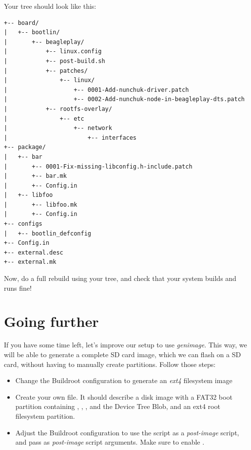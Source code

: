 Your  tree should look like this:

\begin{verbatim}
+-- board/
|   +-- bootlin/
|       +-- beagleplay/
|           +-- linux.config
|           +-- post-build.sh
|           +-- patches/
|               +-- linux/
|                   +-- 0001-Add-nunchuk-driver.patch
|                   +-- 0002-Add-nunchuk-node-in-beagleplay-dts.patch
|           +-- rootfs-overlay/
|               +-- etc
|                   +-- network
|                       +-- interfaces
+-- package/
|   +-- bar
|       +-- 0001-Fix-missing-libconfig.h-include.patch
|       +-- bar.mk
|       +-- Config.in
|   +-- libfoo
|       +-- libfoo.mk
|       +-- Config.in
+-- configs
|   +-- bootlin_defconfig
+-- Config.in
+-- external.desc
+-- external.mk
\end{verbatim}

Now, do a full rebuild using your  tree, and check
that your system builds and runs fine!

\section{Going further}

If you have some time left, let's improve our setup to use {\em
  genimage}. This way, we will be able to generate a complete SD card
image, which we can flash on a SD card, without having to manually
create partitions. Follow those steps:

\begin{itemize}

\item Change the Buildroot configuration to generate an {\em ext4}
  filesystem image

\item Create your own 
  file. It should describe a disk image with a FAT32 boot partition
  containing , ,
  ,  and the Device Tree Blob, and an
  ext4 root filesystem partition.

\item Adjust the Buildroot configuration to use the
   script as a {\em post-image}
  script, and pass 
  as {\em post-image} script arguments. Make sure to enable
  .

\end{itemize}
